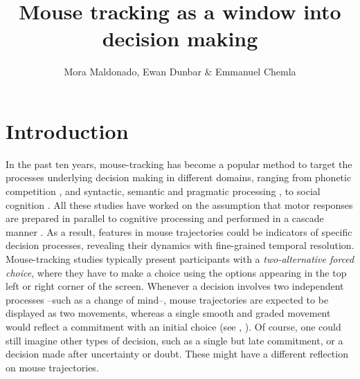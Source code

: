 \documentclass{article}
\title{Mouse tracking as a window into decision making}
\author{Mora Maldonado, Ewan Dunbar \& Emmanuel Chemla}
\begin{document}
\maketitle

\section{Introduction}

In the past ten years, mouse-tracking has become a popular method to target the processes underlying decision making in different domains, ranging from phonetic competition \citep{Spivey2005,cranford2017mouse}, and syntactic, semantic and pragmatic processing \citep[among others]{Farmer2007, Dale2011, tomlinson2013possibly,xiao2014semantic,sauerland2015tracking,xiao2017role}, to social cognition \citep{Freeman2010,Freeman2011,freeman2016more}.
%
All these studies have worked on the assumption that motor responses are prepared in parallel to cognitive processing and performed in a cascade manner \citep{song2006role,Song2009,Freeman2010,spivey2006continuous,Hehman2014}.
%
As a result, features in mouse trajectories could be indicators of specific decision processes, revealing their dynamics with fine-grained temporal resolution. 
%
Mouse-tracking studies typically present participants with a \emph{two-alternative forced choice}, where they have to make a choice using the options appearing in the top left or right corner of the screen. Whenever a decision involves two independent processes --such as a change of mind--, mouse trajectories are expected to be displayed as two movements, whereas a single smooth and graded movement would reflect a commitment with an initial choice (see , \citealp{Wojnowicz2009}).
%
Of course, one could still imagine other types of decision, such as a single but late commitment, or a decision made after uncertainty or doubt. These might have a different reflection on mouse trajectories.
\end{document}

